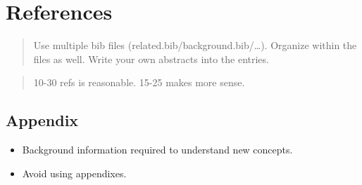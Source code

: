 \documentclass[
  10pt,
  draftcls,
  technote,
  letterpaper,
  oneside,
  onecolumn]{IEEEtran}
\providecommand{\tightlist}{%
  \setlength{\itemsep}{0pt}\setlength{\parskip}{0pt}}
\newlength{\cslhangindent}
\newlength{\cslentryspacingunit} %
\newenvironment{CSLReferences}[2] %
 {%
  \setlength{\parindent}{0pt}
  \ifodd #1
  \let\oldpar\par
  \def\par{\hangindent=\cslhangindent\oldpar}
  \fi
  \setlength{\parskip}{#2\cslentryspacingunit}
 }%
 {}
\begin{document}
\hypertarget{references}{%
\section*{References}\label{references}}

\begin{quote}
Use multiple bib files (related.bib/background.bib/\ldots). Organize
within the files as well. Write your own abstracts into the entries.
\end{quote}

\begin{quote}
10-30 refs is reasonable. 15-25 makes more sense.
\end{quote}

\hypertarget{refs}{}
\begin{CSLReferences}{0}{0}
\end{CSLReferences}

\appendix

\hypertarget{appendix}{%
\subsection{Appendix}\label{appendix}}

\begin{itemize}
\tightlist
\item
  Background information required to understand new concepts.
\item
  Avoid using appendixes.
\end{itemize}
\end{document}
